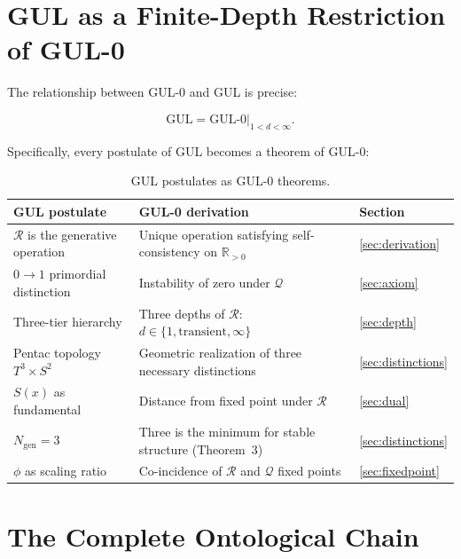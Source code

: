\documentclass[11pt]{article}
\begin{document}
\section{GUL as a Finite-Depth Restriction of GUL-0}
\label{sec:relationship}

The relationship between GUL-0 and GUL is precise:

\begin{equation}
  \mathrm{GUL} = \mathrm{GUL\text{-}0}\big|_{1 < d < \infty}.
\end{equation}

Specifically, every postulate of GUL becomes a theorem of GUL-0:

\begin{table}[htbp]
\centering
\caption{GUL postulates as GUL-0 theorems.}
\label{tab:relationship}
\begin{tabular}{@{}lll@{}}
\toprule
GUL postulate & GUL-0 derivation & Section \\
\midrule
$\mathcal{R}$ is the generative operation
  & Unique operation satisfying self-consistency on $\mathbb{R}_{>0}$
  & \ref{sec:derivation} \\
$0\to 1$ primordial distinction
  & Instability of zero under $\mathcal{Q}$
  & \ref{sec:axiom} \\
Three-tier hierarchy
  & Three depths of $\mathcal{R}$: $d\in\{1,\text{transient},\infty\}$
  & \ref{sec:depth} \\
Pentac topology $T^3\times S^2$
  & Geometric realization of three necessary distinctions
  & \ref{sec:distinctions} \\
$S(x)$ as fundamental
  & Distance from fixed point under $\mathcal{R}$
  & \ref{sec:dual} \\
$N_{\mathrm{gen}}=3$
  & Three is the minimum for stable structure (Theorem~3)
  & \ref{sec:distinctions} \\
$\phi$ as scaling ratio
  & Co-incidence of $\mathcal{R}$ and $\mathcal{Q}$ fixed points
  & \ref{sec:fixedpoint} \\
\bottomrule
\end{tabular}
\end{table}

\section{The Complete Ontological Chain}
\label{sec:chain}
\end{document}
